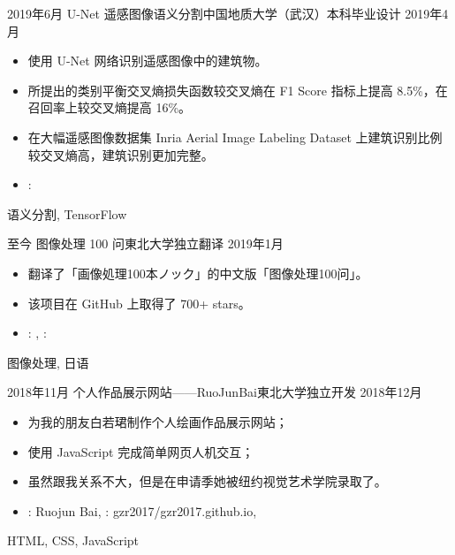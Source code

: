 %
%



\begin{experiences}

  \experience
  {2019年6月}   {U-Net 遥感图像语义分割}{中国地质大学（武汉）}{本科毕业设计}
  {2019年4月} {
    \begin{itemize}
      \item 使用 U-Net 网络识别遥感图像中的建筑物。
      \item 所提出的类别平衡交叉熵损失函数较交叉熵在 F1 Score 指标上提高 8.5\%，在召回率上较交叉熵提高 16\%。
      \item 在大幅遥感图像数据集 Inria Aerial Image Labeling Dataset 上建筑识别比例较交叉熵高，建筑识别更加完整。
      \item \faGithub:
    \end{itemize}
  }
  {语义分割, TensorFlow}
  \emptySeparator

  \experience
  {至今} {图像处理 100 问}{東北大学}{独立翻译}
  {2019年1月}    {
    \begin{itemize}
      \item  翻译了「画像処理100本ノック」的中文版「图像处理100问」。
      \item 该项目在 GitHub 上取得了 700+ stars。
      \item \faGithub:
            , \faGithub: 
    \end{itemize}
  }
  {图像处理, 日语}
  \emptySeparator

  \experience
  { 2018年11月} {个人作品展示网站——RuoJunBai}{東北大学}{独立开发}
  {2018年12月}    {
    \begin{itemize}
      \item 为我的朋友白若珺制作个人绘画作品展示网站；
      \item 使用 JavaScript 完成简单网页人机交互；
      \item 虽然跟我关系不大，但是在申请季她被纽约视觉艺术学院录取了。
      \item \faLink:  {Ruojun Bai}, \faGithub:  {gzr2017/gzr2017.github.io}, 
    \end{itemize}
  }
  {HTML, CSS, JavaScript}
  \emptySeparator


\end{experiences}
